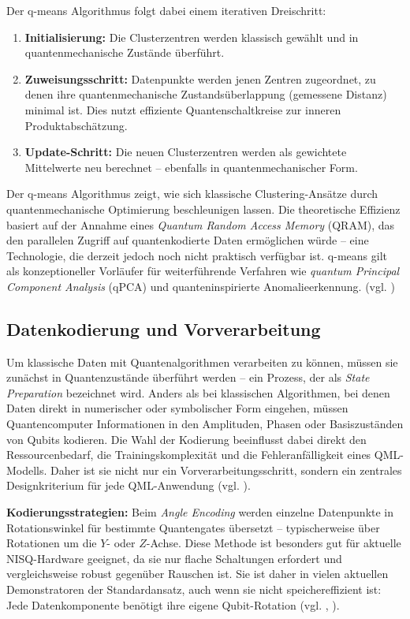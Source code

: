 Der q-means Algorithmus folgt dabei einem iterativen Dreischritt:  
\begin{enumerate}
  \item \textbf{Initialisierung:} Die Clusterzentren werden klassisch gewählt und in quantenmechanische Zustände überführt.
  \item \textbf{Zuweisungsschritt:} Datenpunkte werden jenen Zentren zugeordnet, zu denen ihre quantenmechanische Zustandsüberlappung (gemessene Distanz) minimal ist. Dies nutzt effiziente Quantenschaltkreise zur inneren Produktabschätzung.
  \item \textbf{Update-Schritt:} Die neuen Clusterzentren werden als gewichtete Mittelwerte neu berechnet – ebenfalls in quantenmechanischer Form.
\end{enumerate}  

Der q-means Algorithmus zeigt, wie sich klassische Clustering-Ansätze durch quantenmechanische Optimierung beschleunigen lassen. Die theoretische Effizienz basiert auf der Annahme eines \textit{Quantum Random Access Memory} (QRAM), das den parallelen Zugriff auf quantenkodierte Daten ermöglichen würde – eine Technologie, die derzeit jedoch noch nicht praktisch verfügbar ist. q-means gilt als konzeptioneller Vorläufer für weiterführende Verfahren wie \textit{quantum Principal Component Analysis} (qPCA) und quanteninspirierte Anomalieerkennung. (vgl. \cite{kerenidis_q-means_2019})

\vspace{0.5cm}
\subsection{Datenkodierung und Vorverarbeitung}  
Um klassische Daten mit Quantenalgorithmen verarbeiten zu können, müssen sie zunächst in Quantenzustände überführt werden – ein Prozess, der als \textit{State Preparation} bezeichnet wird. Anders als bei klassischen Algorithmen, bei denen Daten direkt in numerischer oder symbolischer Form eingehen, müssen Quantencomputer Informationen in den Amplituden, Phasen oder Basiszuständen von Qubits kodieren. Die Wahl der Kodierung beeinflusst dabei direkt den Ressourcenbedarf, die Trainingskomplexität und die Fehleranfälligkeit eines QML-Modells. Daher ist sie nicht nur ein Vorverarbeitungsschritt, sondern ein zentrales Designkriterium für jede QML-Anwendung (vgl. \cite{schuld_introduction_2015}).

\vspace{0.3cm}

\textbf{Kodierungsstrategien:}  
Beim \textit{Angle Encoding} werden einzelne Datenpunkte in Rotationswinkel für bestimmte Quantengates übersetzt – typischerweise über Rotationen um die $Y$- oder $Z$-Achse. Diese Methode ist besonders gut für aktuelle NISQ-Hardware geeignet, da sie nur flache Schaltungen erfordert und vergleichsweise robust gegenüber Rauschen ist. Sie ist daher in vielen aktuellen Demonstratoren der Standardansatz, auch wenn sie nicht speichereffizient ist: Jede Datenkomponente benötigt ihre eigene Qubit-Rotation (vgl. \cite{schuld_introduction_2015}, \cite{bsiQuantumMachineLearning2025}).



